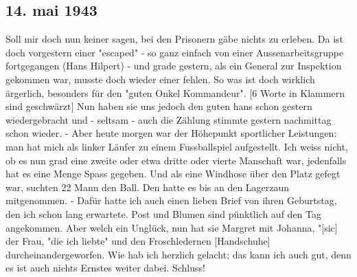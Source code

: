 \subsection{14. mai 1943}

Soll mir doch nun keiner sagen, bei den Prisonern g\"{a}be nichts zu erleben.
Da ist doch vorgestern einer "escaped" - so ganz einfach von einer Aussenarbeitsgruppe fortgegangen (Hans Hilpert) - und grade gestern, als ein General zur Inspektion gekommen war, musste doch wieder einer fehlen.
So was ist doch wirklich \"{a}rgerlich, besonders f\"{u}r den "guten Onkel Kommandeur".
{\color{red} [6 Worte in Klammern sind geschw\"{a}rzt] }
Nun haben sie uns jedoch den guten hans schon gestern wiedergebracht und - seltsam - auch die Z\"{a}hlung stimmte gestern nachmittag schon wieder.
- Aber heute morgen war der H\"{o}hepunkt sportlicher Leistungen: man hat mich als linker L\"{a}ufer zu einem Fussballspiel aufgestellt.
Ich weiss nicht, ob es nun grad eine zweite oder etwa dritte oder vierte Manschaft war, jedenfalls hat es eine Menge Spass gegeben.
Und als eine Windhose \"{u}ber den Platz gefegt war, suchten 22 Mann den Ball.
Den hatte es bis an den Lagerzaun mitgenommen.
- Daf\"{u}r hatte ich auch einen lieben Brief von ihren Geburtstag, den ich schon lang erwartete.
Post und Blumen sind p\"{u}nktlich auf den Tag angekommen.
Aber welch ein Ungl\"{u}ck, nun hat sie Margret mit Johanna, "{\color{red}[sic]} der Frau, "die ich liebte" und den Froschledernen {\color{red}[Handschuhe] } durcheinandergeworfen.
Wie hab ich herzlich gelacht; das kann ich auch gut, denn es ist auch nichts Ernstes weiter dabei.
Schluss!
\clearpage
